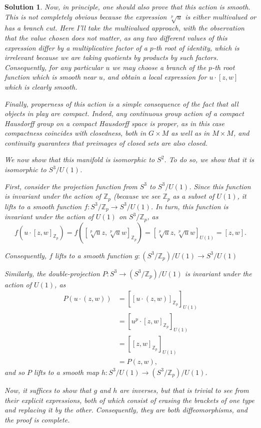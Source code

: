 \documentclass{article}
\theoremstyle{nonumberplain}
\newtheorem{sol}{Solution}
\newcommand{\Z}{\mathbb{Z}}
\begin{document}
\begin{sol}
Now, in principle, one should also prove that this action is smooth. This is not completely obvious because the expression $\sqrt[p]u$ is either multivalued or has a branch cut. Here I'll take the multivalued approach, with the observation that the value chosen does not matter, as any two different values of this expression differ by a multiplicative factor of a $p$-th root of identity, which is irrelevant because we are taking quotients by products by such factors. Consequently, for any particular $u$ we may choose a branch of the $p$-th root function which is smooth near $u$, and obtain a local expression for $u \cdot [z,w]$ which is clearly smooth.

Finally, properness of this action is a simple consequence of the fact that all objects in play are compact. Indeed, any continuous group action of a compact Hausdorff group on a compact Hausdorff space is proper, as in this case compactness coincides with closedness, both in $G \times M$ as well as in $M \times M$,  and continuity guarantees that preimages of closed sets are also closed.

We now show that this manifold is isomorphic to $S^2$. To do so, we show that it is isomorphic to $S^3 / U(1)$.

First, consider the projection function from $S^3$ to $S^3 / U(1)$. Since this function is invariant under the action of $\Z_p$ (because we see $\Z_p$ as a subset of $U(1)$, it lifts to a smooth function $f \colon S^3 / \Z_p \to S^3 / U(1)$. In turn, this function is invariant under the action of $U(1)$ on $S^3 / \Z_p$, as
\[f(u \cdot [z,w]_{\Z_p}) = f([\sqrt[p]u z, \sqrt[p]u w]_{\Z_p}) = [\sqrt[p]u z, \sqrt[p]u w]_{U(1)} = [z,w].\]

Consequently, $f$ lifts to a smooth function $g \colon (S^3 / \Z_p) / U(1) \to S^3 / U(1)$

Similarly, the double-projection $P \colon S^3 \to (S^3 / \Z_p)/U(1)$ is invariant under the action of $U(1)$, as
\begin{align*}
P(u \cdot (z,w)) &= [[u \cdot(z,w)]_{\Z_p}]_{U(1)}\\
&= [ u^p \cdot [z,w]_{\Z_p} ]_{U(1)}\\
&= [[z,w]_{\Z_p} ]_{U(1)}\\
&= P(z,w),
\end{align*}
and so $P$ lifts to a smooth map $h \colon S^3/U(1) \to (S^3 / \Z_p)/U(1)$.

Now, it suffices to show that $g$ and $h$ are inverses, but that is trivial to see from their explicit expressions, both of which consist of erasing the brackets of one type and replacing it by the other. Consequently, they are both diffeomorphisms, and the proof is complete.
\end{sol}
\end{document}

